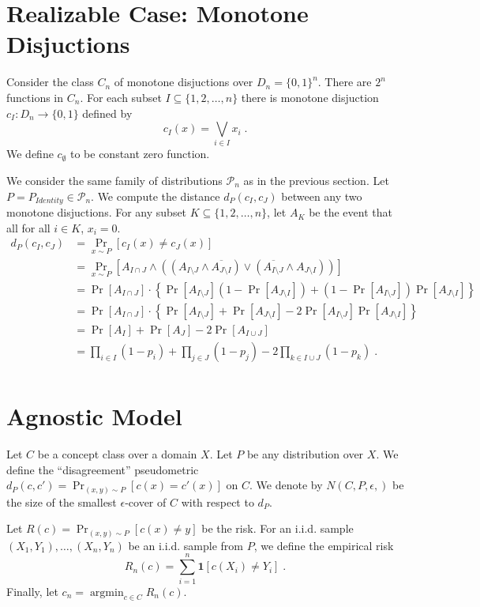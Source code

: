 \documentclass[10pt]{article}
\renewcommand{\P}{\mathcal{P}}
\newcommand{\indicator}[1]{\mathbf{1}\left[{#1}\right]}
\DeclareMathOperator{\argmin}{argmin}
\begin{document}
\section{Realizable Case: Monotone Disjuctions}

Consider the class $C_n$ of monotone disjuctions over $D_n = \{0,1\}^n$.
There are $2^n$ functions in $C_n$. For each subset $I \subseteq \{1,2,\dots,n\}$
there is monotone disjuction $c_I:D_n \to \{0,1\}$ defined by
$$
c_I(x) = \bigvee_{i \in I} x_i \; .
$$
We define $c_\emptyset$ to be constant zero function.

We consider the same family of distributions $\P_n$ as in the previous section.
Let $P = P_{Identity} \in \P_n$. We compute the distance $d_P(c_I, c_J)$
between any two monotone disjuctions. For any subset
$K \subseteq \{1,2,\dots,n\}$, let $A_K$ be the event that all for all $i \in K$, $x_i = 0$.
\begin{align*}
d_P(c_I, c_J)
& = \Pr_{x \sim P}[c_I(x) \neq c_J(x)] \\
& = \Pr_{x \sim P}[A_{I \cap J} \wedge ((A_{I \setminus J} \wedge \overline{A_{J \setminus I}}) \vee (\overline{A_{I \setminus J}} \wedge A_{J \setminus I} )) ] \\
& = \Pr[A_{I \cap J}] \cdot \left\{ \Pr[A_{I \setminus J}] (1 - \Pr[A_{J \setminus I}]) + (1 - \Pr[A_{I \setminus J}]) \Pr[A_{J \setminus I}] \right\} \\
& = \Pr[A_{I \cap J}] \cdot \left\{ \Pr[A_{I \setminus J}] + \Pr[A_{J \setminus I}] - 2 \Pr[A_{I \setminus J}] \Pr[A_{J \setminus I}] \right\} \\
& = \Pr[A_I] + \Pr[A_J] - 2 \Pr[A_{I \cup J}] \\
& = \prod_{i \in I} (1 - p_i) + \prod_{j \in J} (1 - p_j) - 2 \prod_{k \in I \cup J} (1 - p_k) \; . \\
\end{align*}

\section{Agnostic Model}

Let $C$ be a concept class over a domain $X$. Let $P$ be any distribution over
$X$. We define the ``disagreement'' pseudometric $d_P(c,c') = \Pr_{(x,y) \sim
P}[c(x) = c'(x)]$ on $C$. We denote by $N(C,P,\epsilon,)$ be the size of the
smallest $\epsilon$-cover of $C$ with respect to $d_P$.

Let $R(c) = \Pr_{(x,y) \sim P}[c(x) \neq y]$ be the risk.
For an i.i.d. sample $(X_1, Y_1), \dots, (X_n, Y_n)$ be an i.i.d. sample
from $P$, we define the empirical risk
$$
R_n(c) = \sum_{i=1}^n \indicator{c(X_i) \neq Y_i} \; .
$$
Finally, let $c_n = \argmin_{c \in C} R_n(c)$.



\end{document}
